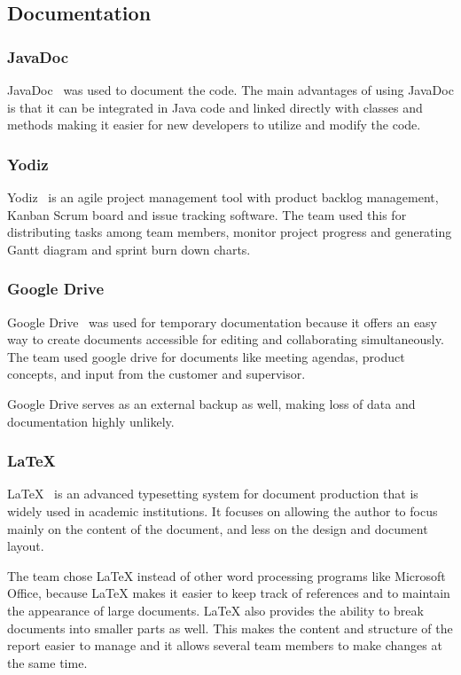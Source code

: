 \subsection{Documentation}

\subsubsection{JavaDoc}
JavaDoc~\cite{javadoc} was used to document the code. The main advantages of using JavaDoc is that it can be integrated in Java code and linked directly with classes and methods making it easier for new developers to utilize and modify the code.

\subsubsection{Yodiz}
Yodiz~\cite{yodiz} is an agile project management tool with product backlog management, Kanban Scrum board and issue tracking software. The team used this for distributing tasks among team members, monitor project progress and generating Gantt diagram and sprint burn down charts.

\subsubsection{Google Drive}
Google Drive~\cite{gdrive} was used for temporary documentation because it offers an easy way to create documents accessible for editing and collaborating simultaneously. The team used google drive for documents like meeting agendas, product concepts, and input from the customer and supervisor. 

Google Drive serves as an external backup as well, making loss of data and documentation highly unlikely.

\subsubsection{\LaTeX}
\LaTeX~\cite{latex} is an advanced typesetting system for document production that is widely used in
academic institutions. It focuses on allowing the author to focus mainly on the content of the document, and less on the design and document layout.

The team chose \LaTeX{} instead of other word processing programs like Microsoft Office, because \LaTeX{} makes it easier to keep track of references and to maintain the appearance of large documents. 
\LaTeX{} also provides the ability to break documents into smaller parts as well. This makes the content and structure of the report easier to manage and it allows several team members to make changes at the same time.

